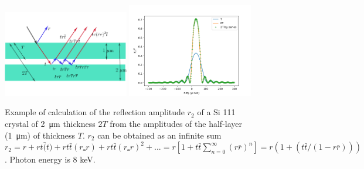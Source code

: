\documentclass[preprint]{iucr}              %
\begin{document}
\begin{figure}\label{fig:doublelayer}
    \centering
    \includegraphics[width=0.49\textwidth]{figures/figlayered2.pdf}
    \includegraphics[width=0.49\textwidth]{figures/doublelayer2.png}
    \caption{Example of calculation of the reflection amplitude $r_2$ of a Si 111 crystal of \SI{2}{\micro\meter} thickness $2T$ from the amplitudes of the half-layer (\SI{1}{\micro\meter}) of thickness $T$. $r_2$ can be obtained as an infinite sum $r_2=r+ r t \bar(t) + r t\bar{t} (r\bar_{r}) + r t\bar{t} (r\bar_{r})^2 + ...= r[1+t\bar{t}\sum_{n=0}^{\infty}(r\bar{r})^n]=r(1 + (t \bar{t} / (1-r \bar{r})))$. Photon energy is 8 keV.
    }
\end{figure}


\end{document}
